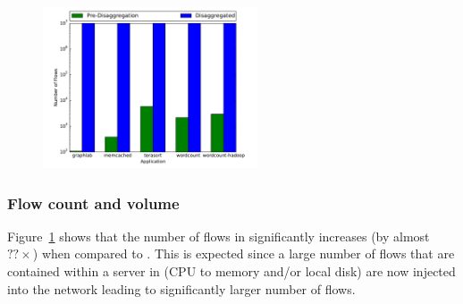 %
\begin{figure}
  \centering
    \includegraphics[width = 2.5in]{img/graph2_numflows} 
  \caption{\small{}}
  \label{fig:nof}
\end{figure}
%
%
\begin{figure}
  \caption{\small{}}
  \label{fig:vof}
\end{figure}
%
\subsubsection{Flow count and volume}
Figure~\ref{fig:nof} shows that the number of flows in \dis significantly increases (by almost $??\times$) when compared to \pdis. This is expected since a large number of flows that are contained within a server in \pdis (CPU to memory and/or local disk) are now injected into the network leading to significantly larger number of flows.

